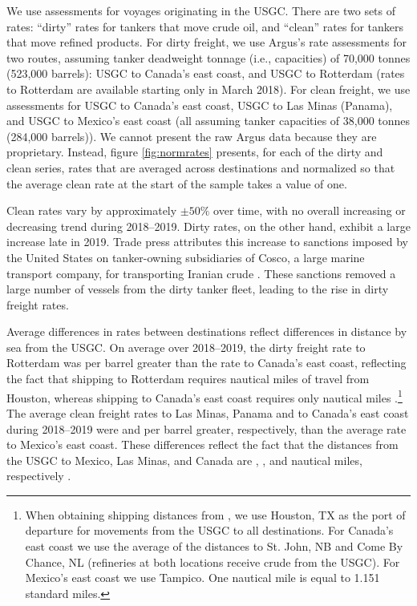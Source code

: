 \documentclass[12pt]{article}
\begin{document}
We use assessments for voyages originating in the USGC. There are two sets of rates: ``dirty'' rates for tankers that move crude oil, and ``clean'' rates for tankers that move refined products. For dirty freight, we use Argus's rate assessments for two routes, assuming tanker deadweight tonnage (i.e., capacities) of 70,000 tonnes (523,000 barrels): USGC to Canada's east coast, and USGC to Rotterdam (rates to Rotterdam are available starting only in March 2018). For clean freight, we use assessments for USGC to Canada's east coast, USGC to Las Minas (Panama), and USGC to Mexico's east coast (all assuming tanker capacities of 38,000 tonnes (284,000 barrels)). We cannot present the raw Argus data because they are proprietary. Instead, figure \ref{fig:normrates} presents, for each of the dirty and clean series, rates that are averaged across destinations and normalized so that the average clean rate at the start of the sample takes a value of one.

Clean rates vary by approximately $\pm 50\%$ over time, with no overall increasing or decreasing trend during 2018--2019. Dirty rates, on the other hand, exhibit a large increase late in 2019. Trade press attributes this increase to sanctions imposed by the United States on tanker-owning subsidiaries of Cosco, a large marine transport company, for transporting Iranian crude \citep{danishreview_2019,SPglobal_2020}. These sanctions removed a large number of vessels from the dirty tanker fleet, leading to the rise in dirty freight rates.

Average differences in rates between destinations reflect differences in distance by sea from the USGC. On average over 2018--2019, the dirty freight rate to Rotterdam was per barrel greater than the rate to Canada's east coast, reflecting the fact that shipping to Rotterdam requires nautical miles of travel from Houston, whereas shipping to Canada's east coast requires only nautical miles \citep{Searoutes2023}.\footnote{When obtaining shipping distances from \cite{Searoutes2023}, we use Houston, TX as the port of departure for movements from the USGC to all destinations. For Canada's east coast we use the average of the distances to St. John, NB and Come By Chance, NL (refineries at both locations receive crude from the USGC). For Mexico's east coast we use Tampico. One nautical mile is equal to 1.151 standard miles.} The average clean freight rates to Las Minas, Panama and to Canada's east coast during 2018--2019 were and per barrel greater, respectively, than the average rate to Mexico's east coast. These differences reflect the fact that the distances from the USGC to Mexico, Las Minas, and Canada are  \unskip, \unskip, and nautical miles, respectively \citep{Searoutes2023}.
\end{document}
